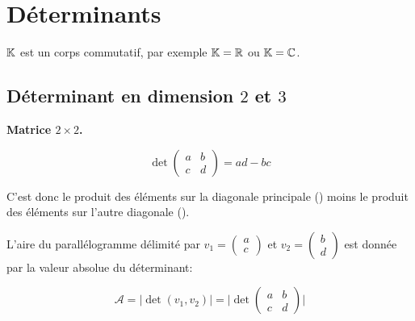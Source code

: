 \documentclass[10pt,class=article,crop=false]{standalone}
\begin{document}
	
\section{Déterminants}

\begin{multicols}{2}
	
$\mathbb{K}$ est un corps commutatif, par exemple $\mathbb{K}=\mathbb{R}$ ou $\mathbb{K}=\mathbb{C}$.

\subsection{Déterminant en dimension $2$ et $3$}

\textbf{Matrice $2 \times 2$.}

\begin{center}
\begin{minipage}{0.2\textwidth}
$$\det \begin{pmatrix}a&b\\c&d\end{pmatrix} = ad-bc$$
\end{minipage}
\begin{minipage}{0.2\textwidth}
\end{minipage}
\end{center}	

C'est donc le produit des éléments sur la diagonale principale
() moins le produit des éléments sur l'autre diagonale ().

\begin{proposition}\label{prop:aire}
	L'aire du parallélogramme délimité par $v_1= \left(\begin{smallmatrix}a\\c\end{smallmatrix}\right)$ et
	$v_2= \left(\begin{smallmatrix}b\\d\end{smallmatrix}\right)$ est donnée par la valeur absolue du déterminant:
\begin{center}
\begin{minipage}{0.27\textwidth}	
	$$\mathcal{A}
	= \Big|\det(v_1,v_2)\Big|
	= \Big|\det
	\begin{pmatrix}
		a & b \\
		c & d
	\end{pmatrix}\Big|
	$$
\end{minipage}
\begin{minipage}{0.15\textwidth}
	

\end{minipage}
\end{center}
\end{proposition}
\end{multicols}
\end{document}
